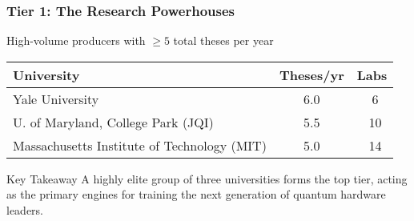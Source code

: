\documentclass[aspectratio=169]{beamer}
\newcommand{\tabletext}{\small}
\begin{document}
\begin{frame}
    \frametitle{Tier 1: The Research Powerhouses}
    High-volume producers with $\geq 5$ total theses per year
    \begin{table}
        \centering
        \tabletext
        \begin{tabularx}{\textwidth}{
            l
            S[table-format=1.1]
            S[table-format=2.0, table-space-text-pre=~]
        }
            \toprule
            \textbf{University} & {\textbf{Theses/yr}} & {\textbf{Labs}} \\
            \midrule
            Yale University & 6.0 & ~6 \\
            U. of Maryland, College Park (JQI) & 5.5 & ~10 \\
            Massachusetts Institute of Technology (MIT) & 5.0 & ~14 \\
            \bottomrule
        \end{tabularx}
    \end{table}
    
    \begin{block}{Key Takeaway}
    A highly elite group of three universities forms the top tier, acting as the primary engines for training the next generation of quantum hardware leaders.
    \end{block}
\end{frame}
\end{document}
